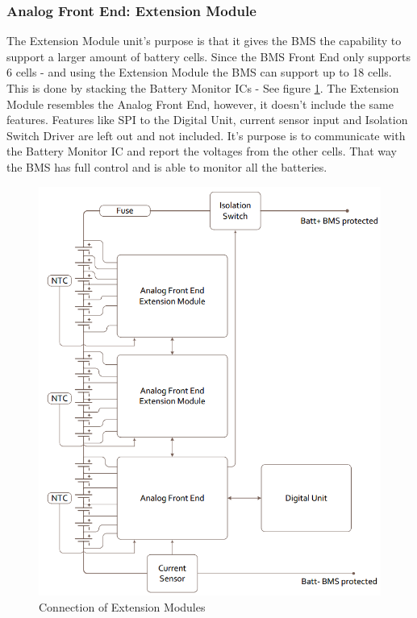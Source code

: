 \subsubsection{Analog Front End: Extension Module}
The Extension Module unit's purpose is that it gives the BMS the capability to support a larger amount of battery cells. Since the BMS Front End only supports 6 cells - and using the Extension Module the BMS can support up to 18 cells. This is done by stacking the Battery Monitor ICs - See figure \ref{fig:BMSextensionmod}. The Extension Module resembles the Analog Front End, however, it doesn't include the same features. Features like SPI to the Digital Unit, current sensor input and Isolation Switch Driver are left out and not included. It's purpose is to communicate with the Battery Monitor IC and report the voltages from the other cells. That way the BMS has full control and is able to monitor all the batteries.

\begin{figure}[H]
	\centering
	\includegraphics[width=1.0\linewidth]{Hardware/Pictures/BMSextensionmod}
	\caption[Empty]{Connection of Extension Modules\footnotemark}
	\label{fig:BMSextensionmod}
\end{figure}

